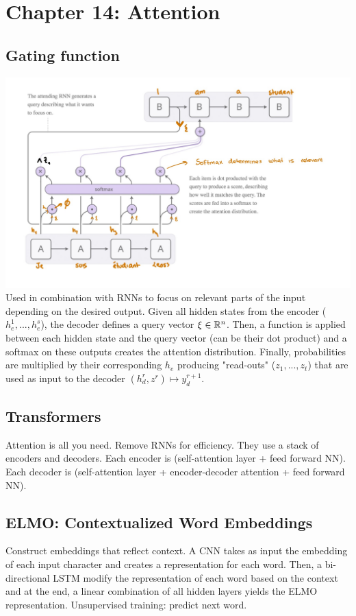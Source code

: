 \section*{Chapter 14: Attention}
\subsection*{Gating function}
\includegraphics[width=\columnwidth]{src/gating-function.jpg}
Used in combination with RNNs to focus on relevant parts of the input depending on the desired output. Given all hidden states from the encoder ($h_e^1, ..., h_e^s$), the decoder defines a query vector $\xi \in \mathbb{R}^n$. Then, a function is applied between each hidden state and the query vector (can be their dot product) and a softmax on these outputs creates the attention distribution. Finally, probabilities are multiplied by their corresponding $h_e$ producing "read-outs" ($z_1, ..., z_t$) that are used as input to the decoder $(h_d^r, z^r) \mapsto y_d^{r+1}$.

\subsection*{Transformers}
Attention is all you need. Remove RNNs for efficiency. They use a stack of encoders and decoders. Each encoder is (self-attention layer + feed forward NN). Each decoder is (self-attention layer + encoder-decoder attention + feed forward NN).

\subsection*{ELMO: Contextualized Word Embeddings}
Construct embeddings that reflect context. A CNN takes as input the embedding of each input character and creates a representation for each word. Then, a bi-directional LSTM modify the representation of each word based on the context and at the end, a linear combination of all hidden layers yields the ELMO representation. Unsupervised training: predict next word.